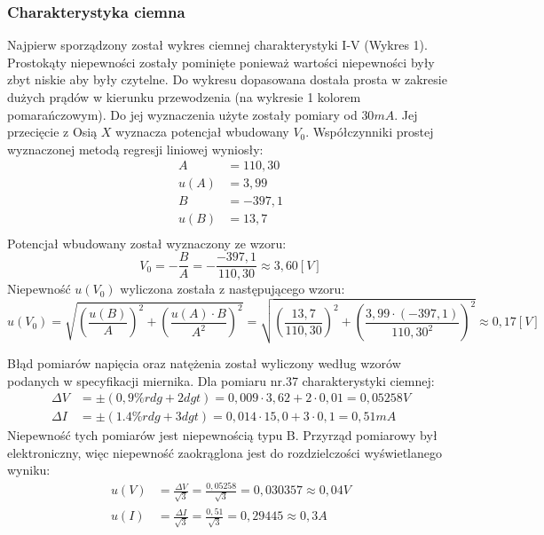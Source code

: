 \documentclass[polish, 11pt, a4paper]{article}
\begin{document}
	\subsubsection{Charakterystyka ciemna}
		Najpierw sporządzony został wykres ciemnej charakterystyki I-V (Wykres 1). Prostokąty niepewności zostały pominięte ponieważ wartości niepewności były zbyt niskie aby były czytelne. 
		Do wykresu dopasowana dostała prosta w zakresie dużych prądów w kierunku przewodzenia (na wykresie 1 kolorem pomarańczowym). Do jej wyznaczenia użyte zostały pomiary od \(30mA\). Jej przecięcie z Osią \(X\) wyznacza potencjał wbudowany \(V_0\).
		Współczynniki prostej wyznaczonej metodą regresji liniowej wyniosły:
		\begin{align*}
		A	&= 110,30\\
		u(A)&= 3,99\\
		B	&= - 397,1\\
		u(B)&= 13,7\\
		\end{align*}
		Potencjał wbudowany został wyznaczony ze wzoru:
		\begin{displaymath}
			V_0=-\frac{B}{A} = -\frac{-397,1}{110,30} \approx 3,60 [V]
		\end{displaymath}
		Niepewność \(u(V_0)\) wyliczona została z następującego wzoru:
		\begin{displaymath}
			u(V_0)	= \sqrt{\left(\frac{u(B)}{A}\right)^2+\left(\frac{u(A)\cdot B}{A^2}\right)^2}
					= \sqrt{\left(\frac{13,7}{110,30}\right)^2+\left(\frac{3,99\cdot (-397,1)}{110,30^2}\right)^2}
					\approx 0,17 [V]
		\end{displaymath}
		
		Błąd pomiarów napięcia oraz natężenia został wyliczony według wzorów podanych w specyfikacji miernika. Dla pomiaru nr.37 charakterystyki ciemnej:
		\begin{align*}
			\Delta V&=\pm(0,9\%rdg+2dgt) = 0,009\cdot 3,62 + 2\cdot 0,01 = 0,05258 V\\
			\Delta I&=\pm(1.4\%rdg+3dgt) = 0,014\cdot 15,0 + 3\cdot 0,1 = 0,51 mA
		\end{align*}
		Niepewność tych pomiarów jest niepewnością typu B. Przyrząd pomiarowy był elektroniczny, więc niepewność zaokrąglona jest do rozdzielczości wyświetlanego wyniku:
		\begin{align*}
			u(V) &= \frac{\Delta V}{\sqrt{3}} = \frac{0,05258}{\sqrt{3}} = 0,030357 \approx 0,04V\\[10pt]
			u(I) &= \frac{\Delta I}{\sqrt{3}} = \frac{0,51}{\sqrt{3}} = 0,29445 \approx 0,3A\\
		\end{align*}
\end{document}
